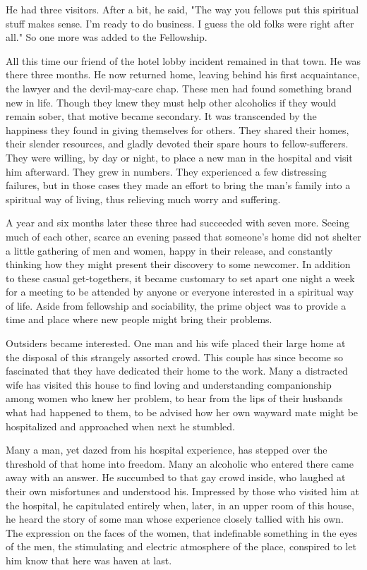 \begin{biblechapter}
He had three visitors.  After a bit, he said, "The way you fellows put this spiritual stuff makes sense.  I'm ready to do business.  I guess the old folks were right after all."  So one more was added to the Fellowship.

All this time our friend of the hotel lobby incident remained in that town.  He was there three months.  He now returned home, leaving behind his first acquaintance, the lawyer and the devil-may-care chap.  These men had found something brand new in life.  Though they knew they must help other alcoholics if they would remain sober, that motive became secondary.  It was transcended by the happiness they found in giving  themselves for others.  They shared their homes, their slender resources, and gladly devoted their spare hours to fellow-sufferers.  They were willing, by day or night, to place a new man in the hospital and visit him afterward.  They grew in numbers.  They experienced a few distressing failures, but in those cases they made an effort to bring the man's family into a spiritual way of living, thus relieving much worry and suffering.

A year and six months later these three had succeeded with seven more.  Seeing much of each other, scarce an evening passed that someone's home did not shelter a little gathering of men and women, happy in their release, and constantly thinking how they might present their discovery to some newcomer.  In addition to these casual get-togethers, it became customary to set apart one night a week for a meeting to be attended by anyone or everyone interested in a spiritual way of life.  Aside from fellowship and sociability, the prime object was to provide a time and place where new people might bring their problems.

Outsiders became interested.  One man and his wife placed their large home at the disposal of this strangely assorted crowd.  This couple has since become so fascinated that they have dedicated their home to the work.  Many a distracted wife has visited this house to find loving and understanding companionship among women who knew her problem, to hear from the lips of their husbands what had happened to them, to be advised how her own wayward mate might be hospitalized and approached when next he stumbled.

Many a man, yet dazed from his hospital experience, has stepped over the threshold of that home into freedom.  Many an alcoholic who entered there came away with an answer.  He succumbed to that gay crowd inside, who laughed at their own misfortunes and understood his.  Impressed by those who visited him at the hospital, he capitulated entirely when, later, in an upper room of this house, he heard the story of some man whose experience closely tallied with his own.  The expression on the faces of the women, that indefinable something in the eyes of the men, the stimulating and electric atmosphere of the place, conspired to let him know that here was haven at last.


\end{biblechapter}

